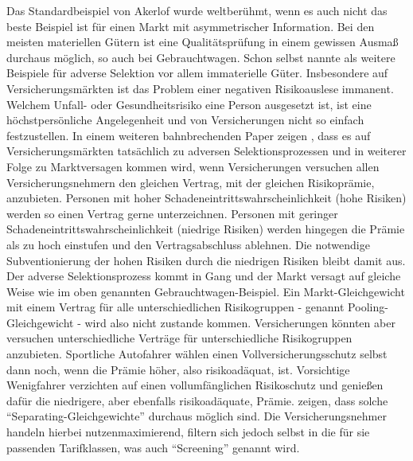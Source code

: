Das Standardbeispiel von Akerlof wurde weltberühmt, wenn es auch nicht das beste Beispiel ist für einen Markt mit asymmetrischer Information. Bei den meisten materiellen Gütern ist eine Qualitätsprüfung in einem gewissen Ausmaß durchaus möglich, so auch bei Gebrauchtwagen. Schon \textcite[S. 492]{Akerlof1970} selbst nannte als weitere Beispiele für adverse Selektion vor allem immaterielle Güter. Insbesondere auf Versicherungsmärkten ist das Problem einer negativen Risikoauslese immanent. Welchem Unfall- oder Gesundheitsrisiko eine Person ausgesetzt ist, ist eine höchstpersönliche Angelegenheit und von Versicherungen nicht so einfach festzustellen. In einem weiteren bahnbrechenden Paper zeigen \textcite{Stiglitz1976a}, dass es auf Versicherungsmärkten tatsächlich zu adversen Selektionsprozessen und in weiterer Folge zu Marktversagen kommen wird, wenn Versicherungen versuchen allen Versicherungsnehmern den gleichen Vertrag, mit der gleichen Risikoprämie, anzubieten. Personen mit hoher Schadeneintrittswahrscheinlichkeit (hohe Risiken) werden so einen Vertrag gerne unterzeichnen. Personen mit geringer Schadeneintrittswahrscheinlichkeit (niedrige Risiken) werden hingegen die Prämie als zu hoch einstufen und den Vertragsabschluss ablehnen. Die notwendige Subventionierung der hohen Risiken durch die niedrigen Risiken bleibt damit aus. Der adverse Selektionsprozess kommt in Gang und der Markt versagt auf gleiche Weise wie im oben genannten Gebrauchtwagen-Beispiel. Ein Markt-Gleichgewicht mit einem Vertrag für alle unterschiedlichen Risikogruppen - genannt Pooling-Gleichgewicht - wird also nicht zustande kommen. Versicherungen könnten aber versuchen unterschiedliche Verträge für unterschiedliche Risikogruppen anzubieten. Sportliche Autofahrer wählen einen Vollversicherungsschutz selbst dann noch, wenn die Prämie höher, also risikoadäquat, ist. Vorsichtige Wenigfahrer verzichten auf einen vollumfänglichen Risikoschutz und genießen dafür die niedrigere, aber ebenfalls risikoadäquate, Prämie. \textcite[S. 634ff]{Stiglitz1976a} zeigen, dass solche "`Separating-Gleichgewichte"' durchaus möglich sind. Die Versicherungsnehmer handeln hierbei nutzenmaximierend, filtern sich jedoch selbst in die für sie passenden Tarifklassen, was auch "`Screening"' genannt wird.

